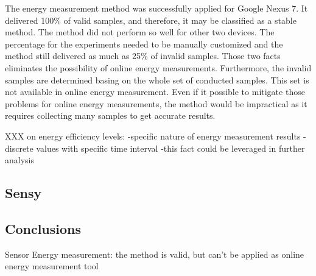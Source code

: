 The energy measurement method was successfully applied for Google Nexus 7. It delivered 100\% of valid samples, and therefore, it may be classified as a stable method. The method did not perform so well for other two devices. The percentage for the experiments needed to be manually customized and the method still delivered as much as 25\% of invalid samples. Those two facts eliminates the possibility of online energy measurements. Furthermore, the invalid samples are determined basing on the whole set of conducted samples. This set is not available in online energy measurement. Even if it possible to mitigate those problems for online energy measurements, the method would be impractical as it requires collecting many samples to get accurate results.  

XXX on energy efficiency levels:
	-specific nature of energy measurement results
	-discrete values with specific time interval
	-this fact could be leveraged in further analysis

\subsection{Sensy}
\subsection{Conclusions}
Sensor Energy measurement:
	the method is valid, but can't be applied as online energy measurement tool